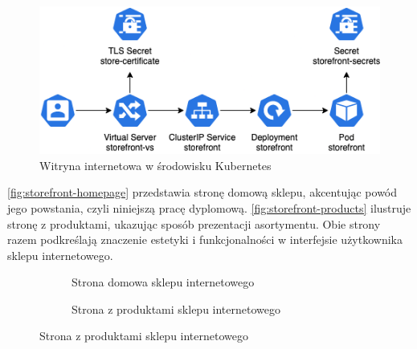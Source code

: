 \begin{figure}[H]
    \centering
    \includegraphics[width=\textwidth]{img/kubernetes-storefront}
    \caption{Witryna internetowa w środowisku Kubernetes}
    \label{fig:kubernetes-storefront}
\end{figure}

\autoref{fig:storefront-homepage} przedstawia stronę domową sklepu, akcentując powód jego powstania, czyli niniejszą pracę dyplomową.
\autoref{fig:storefront-products} ilustruje stronę z produktami, ukazując sposób prezentacji asortymentu.
Obie strony razem podkreślają znaczenie estetyki i funkcjonalności w interfejsie użytkownika sklepu internetowego.

\begin{figure}[p]
    \begin{figure}[H]
        \centering
        \caption{Strona domowa sklepu internetowego}
        \label{fig:storefront-homepage}
    \end{figure}

    \begin{figure}[H]
        \centering
        \caption{Strona z produktami sklepu internetowego}
        \label{fig:storefront-products}
    \end{figure}
\end{figure}

